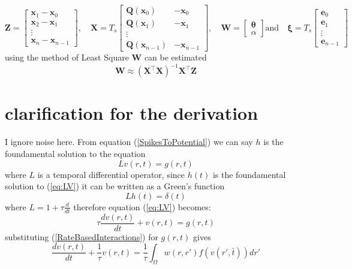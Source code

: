 \documentclass[onecolumn,draftcls]{IEEEtran}
\begin{document}
\begin{equation}
 \mathbf Z=\begin{bmatrix} \mathbf x_{1}-\mathbf x_{0}\\\mathbf x_{2}-\mathbf x_{1}\\\vdots\\\mathbf x_{n}-\mathbf x_{n-1}\end{bmatrix},\quad \mathbf X=T_s\begin{bmatrix}\mathbf Q(\mathbf x_0)&-\mathbf x_{0}\\\mathbf Q(\mathbf x_1)&-\mathbf x_{1}\\\vdots\\ \mathbf Q(\mathbf x_{n-1})&-\mathbf x_{n-1}\end{bmatrix},\quad \mathbf W=\begin{bmatrix}\mathbf \theta \\ \alpha\end{bmatrix} \text{and}\quad \boldsymbol \xi=T_s\begin{bmatrix}\mathbf e_0\\\mathbf e_1\\\vdots\\\mathbf e_{n-1}\end{bmatrix}
\end{equation}
using the method of Least Square $ \mathbf W$ can be estimated
\begin{equation}
 \mathbf W\approx(\mathbf X^\top\mathbf X)^{-1}\mathbf X^\top\mathbf Z
\end{equation}
\section{clarification for the derivation} 
I ignore noise here. From equation (\ref{SpikesToPotential}) we can say $h$ is the foundamental solution to the equation
\begin{equation}
 Lv(r,t)=g(r,t)
\label{eq:LV}
\end{equation}
where $L$ is a temporal differential operator, since $h(t)$ is the foundamental solution to (\ref{eq:LV}) it can be written as a Green's function
\begin{equation}
 Lh(t)=\delta(t)
\end{equation}
where $L=1+\tau\frac{d}{dt}$ therefore equation (\ref{eq:LV}) becomes:
\begin{equation}
\tau\frac{dv(r,t)}{dt}+ v(r,t)=g(r,t)
\end{equation}
substituting (\ref{RateBasedInteractions}) for $g(r,t)$ gives
\begin{equation}
\frac{dv\left( {r,t} \right)}{dt} + \frac{1}{\tau} v\left( r,t \right) = \frac{1}{\tau}\int_\Omega  {w\left( r,r' \right)f\left( {v\left( r',\bar t \right)} \right)dr'} 
\end{equation}
\end{document}
